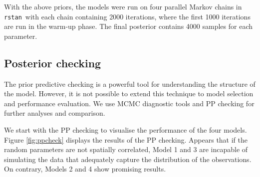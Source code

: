 \documentclass[a4paper]{article}   	%
\newcommand{\rstan}{\texttt{rstan}}
\begin{document}
	With the above priors, the models were run on four parallel Markov chains in \rstan\ with each chain containing 2000 iterations, where the first 1000 iterations are run in the warm-up phase. The final posterior contains 4000 samples for each parameter. 	
	
	\subsection{Posterior checking}\label{ss:PostCheck}
	
	The prior predictive checking is a powerful tool for understanding the structure of the model. However, it is not possible to extend this technique to model selection and performance evaluation. We use MCMC diagnostic tools and PP checking for further analyses and comparison. 	
	
	We start with the PP checking to visualise the performance of the four models. Figure \ref{fig:ppcheck} displays the results of the PP checking. Appears that if the random parameters are not spatially correlated, Model 1 and 3 are incapable of simulating the data that adequately capture the distribution of the observations. On contrary, Models 2 and 4 show promising results. 	
	
\end{document}
